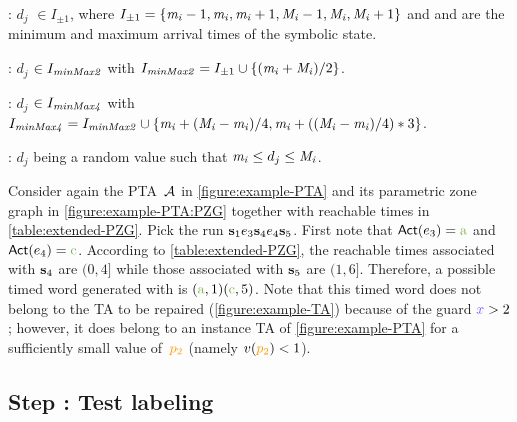 \begin{tikzborder}{\cite{Gargantini16:validation}}
\begin{tikzborder}{\cite{gargantini_combinatorial_2017}}
\begin{tikzborder}{\cite{garn2019}}
\begin{tikzborder}{\cite{arcaini2019achieving}}
\begin{tikzborder}{\cite{arcaini2019varivolution}}
\begin{tikzborder}{}
\begin{compactitem}
	\item \policyminusplus: $d_j$ $\in I_{\pm 1}$, where $I_{\pm 1}=\{\mathit{m_i}-1, \mathit{m_i}, \mathit{m_i}+1, \mathit{M_i}-1, \mathit{M_i}, \mathit{M_i}+1\}$ and \mintime and \maxtime are the minimum and maximum arrival times of the symbolic state.
	\item \policymiddle: $d_j$ $\in I_{\it minMax2}$ with $I_{\it minMax2} = I_{\pm 1} \cup \{(\mathit{m_i}+\mathit{M_i})/2 \}$.
	\item \policyquarter: $d_j$ $\in I_{\it minMax4}$ with $I_{\it minMax4} = I_{\it minMax2} \cup \{\mathit{m_i}+ (\mathit{M_i}-\mathit{m_i})/4, \mathit{m_i}+ ((\mathit{M_i}-\mathit{m_i})/4)*3\}$.
	\item \policyrand: $d_j$ being a random value such that $\mathit{m_i} \le d_j \le \mathit{M_i}$.
\end{compactitem}

\begin{example}\label{example:timedword}
	Consider again the PTA~$\mathcal{A}$ in \ref{figure:example-PTA} and its parametric zone graph in \ref{figure:example-PTA:PZG} together with reachable times in \ref{table:extended-PZG}.
	Pick the run $\mathbf{s}_1 e_3 \mathbf{s}_4 e_4 \mathbf{s}_5$.
	First note that $\act(\edge_3) = \styleact{a}$ and $\act(\edge_4) = \styleact{c}$.
	According to \ref{table:extended-PZG}, the reachable times associated with $\mathbf{s}_4$ are $(0,4]$ while those associated with $\mathbf{s}_5$ are $(1,6]$.
	Therefore, a possible timed word generated with \policyminusplus is $(\styleact{a}, 1) (\styleact{c}, 5)$.
	Note that this timed word does not belong to the TA to be repaired (\ref{figure:example-TA}) because of the guard $\styleclock{x} > 2$; however, it does belong to an instance TA of \ref{figure:example-PTA} for a sufficiently small value of~$\parami{2}$ (namely $\pval(\parami{2}) < 1$).
\end{example}
\end{tikzborder}

\subsection{Step : Test labeling}


\end{tikzborder}
\end{tikzborder}
\end{tikzborder}
\end{tikzborder}
\end{tikzborder}
